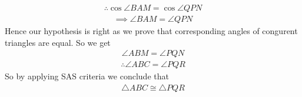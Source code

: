 \begin{align}
\therefore \cos\angle BAM =  \cos\angle QPN
\end{align}
\begin{align}
\implies \angle BAM = \angle QPN
\end{align}
Hence our hypothesis is right as we prove that corresponding angles of congurent triangles are equal. So we get 
\begin{align}
\angle ABM=\angle PQN    
\end{align}
\begin{align}
\therefore \angle ABC=\angle PQR    
\end{align}
So by applying SAS criteria we conclude that\\
\begin{align}
\triangle{ABC}\cong\triangle{PQR}
\end{align}
